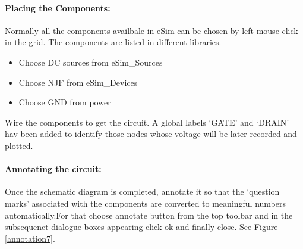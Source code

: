 \paragraph{Placing the Components:} Normally all the components availbale in eSim can be chosen by left mouse click in the grid. The components are listed in different libraries. %


\begin{itemize}
\item
Choose DC sources from eSim\_Sources
\item
Choose NJF from eSim\_Devices
\item
Choose GND from power
\end{itemize}



Wire the components to get the circuit. A global labels `GATE' and `DRAIN' hav been added to identify those nodes whose voltage will be later recorded and plotted.

\paragraph{Annotating the circuit:} Once the schematic diagram is completed, annotate it so that the `question marks' associated with the components are converted to meaningful numbers automatically.For that choose annotate button from the top toolbar%
and in the subsequenct dialogue boxes appearing click ok and finally close. See Figure \ref{annotation7}.




